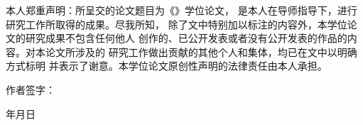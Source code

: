 \vspace{0.65cm}

{\songti\fontsize{14bp}{24bp}\selectfont

\setlength{\parindent}{2em}
\setlength{\parskip}{0bp}

本人郑重声明：所呈交的论文题目为《\thesistitlezh》学位论文，
是本人在导师指导下，进行研究工作所取得的成果。尽我所知，
除了文中特别加以标注的内容外，本学位论文的研究成果不包含任何他人
创作的、已公开发表或者没有公开发表的作品的内容。对本论文所涉及的
研究工作做出贡献的其他个人和集体，均已在文中以明确方式标明
并表示了谢意。本学位论文原创性声明的法律责任由本人承担。

\vspace{4.20cm}

\noindent
\hspace*{8.1cm}作者签字：

\par
\vspace{0.25cm}

\noindent
\hspace*{11.2cm}年\hspace{1.6em}月\hspace{1.6em}日

}

\endgroup

\clearpage
